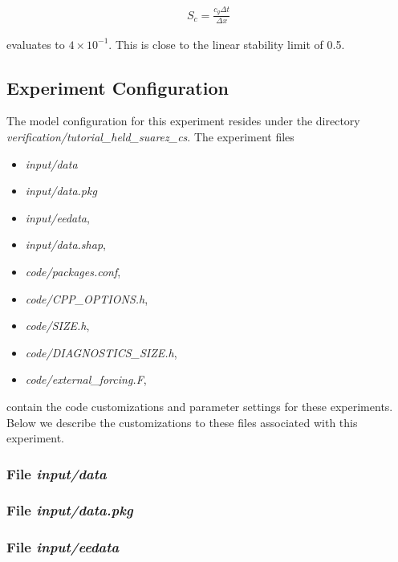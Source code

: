 \begin{eqnarray}
\label{eq:eg-hs-gfl_stability}
S_{c} = \frac{c_{g} \Delta t}{ \Delta x}
\end{eqnarray}

\noindent evaluates to $4 \times 10^{-1}$. This is close to the linear
stability limit of 0.5.
  
\subsection{Experiment Configuration}
\label{sec:eg-hs_examp_exp_config}

The model configuration for this experiment resides under the 
directory {\it verification/tutorial\_held\_suarez\_cs}.  The experiment files 
\begin{itemize}
\item {\it input/data}
\item {\it input/data.pkg}
\item {\it input/eedata},
\item {\it input/data.shap},
\item {\it code/packages.conf},
\item {\it code/CPP\_OPTIONS.h},
\item {\it code/SIZE.h},
\item {\it code/DIAGNOSTICS\_SIZE.h},
\item {\it code/external\_forcing.F},
\end{itemize}
contain the code customizations and parameter settings for these
experiments. Below we describe the customizations
to these files associated with this experiment.

\subsubsection{File {\it input/data}}



\subsubsection{File {\it input/data.pkg}}



\subsubsection{File {\it input/eedata}}

